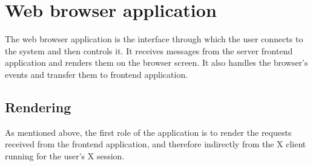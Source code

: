 \chapter{Web browser application}
%
The web browser application is the interface through which the user connects to the system 
and then controls it. It receives messages from the server frontend application and renders them 
on the browser screen. It also handles the browser's events and transfer them to frontend
application.

%
\section{Rendering}
%
As mentioned above, the first role of the application is to render the requests received from 
the frontend application, and therefore indirectly from the X client running for the user's 
X session.



